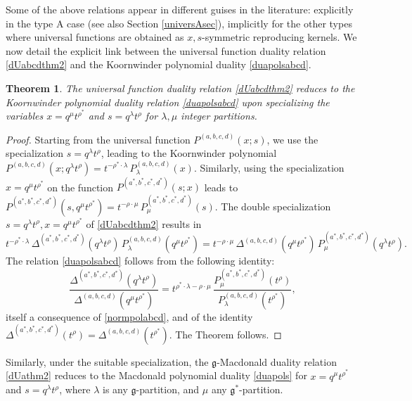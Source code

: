 \documentclass[12pt]{amsart}
\newtheorem{thm}{Theorem}[section]
\newcommand{\g}{{\mathfrak{g}}}
\numberwithin{equation}{section}
\begin{document}
Some of the above relations appear in different guises in the literature: explicitly in the type A case \cite{ShiraishiNoumi} (see also Section \ref{universAsec}), implicitly
for the other types \cite{Cherednik95,cheredMehta} where universal functions are obtained as $x,s$-symmetric
reproducing kernels. We now detail the explicit link between the universal function duality relation \eqref{dUabcdthm2}
and the Koornwinder polynomial duality \eqref{duapolsabcd}.

\begin{thm}
The universal function duality relation \eqref{dUabcdthm2} reduces to the Koornwinder polynomial duality relation \eqref{duapolsabcd} upon specializing the variables $x=q^\mu t^{\rho^*}$ and $s=q^\lambda t^\rho$ for $\lambda,\mu$ integer partitions.
\end{thm}
\begin{proof}
Starting from the universal function $P^{(a,b,c,d)}(x;s)$, we use the specialization
$s=q^\lambda t^\rho$, leading to the 
Koornwinder polynomial
$P^{(a,b,c,d)}(x;q^\lambda t^\rho)=t^{-\rho^*\cdot\lambda} \, P^{(a,b,c,d)}_\lambda(x)$. Similarly, using the specialization
$x=q^\mu t^{\rho^*}$ on the function $P^{(a^*,b^*,c^*,d^*)}(s;x)$ leads to 
$P^{(a^*,b^*,c^*,d^*)}(s,q^\mu t^{\rho^*})=t^{-\rho\cdot\mu} \, P^{(a^*,b^*,c^*,d^*)}_\mu(s)$.
The double specialization $s=q^\lambda t^\rho,x=q^\mu t^{\rho^*}$ of \eqref{dUabcdthm2} results in
\begin{equation}\label{duaP}
t^{-\rho^*\cdot \lambda}\, \Delta^{(a^*,b^*,c^*,d^*)}(q^\lambda t^\rho) \, P^{(a,b,c,d)}_\lambda(q^\mu t^{\rho^*})=t^{-\rho\cdot \mu}\, \Delta^{(a,b,c,d)}(q^\mu t^{\rho^*})\, P_\mu^{(a^*,b^*,c^*,d^*)}(q^\lambda t^{\rho}).
\end{equation}
The relation \eqref{duapolsabcd} follows from the following identity:
\begin{equation}\label{idenDelta}
\frac{\Delta^{(a^*,b^*,c^*,d^*)}(q^\lambda t^\rho)}{\Delta^{(a,b,c,d)}(q^\mu t^{\rho^*})} =t^{\rho^*\cdot \lambda-\rho\cdot \mu}
\,\frac{P_\mu^{(a^*,b^*,c^*,d^*)}(t^{\rho})}{P^{(a,b,c,d)}_\lambda(t^{\rho^*})},
\end{equation}
itself a consequence of \eqref{normpolabcd}, and of the identity $\Delta^{(a^*,b^*,c^*,d^*)}(t^\rho)=\Delta^{(a,b,c,d)}(t^{\rho^*})$.
The Theorem follows.
\end{proof}

Similarly, under the suitable specialization, the $\g$-Macdonald duality relation \eqref{dUathm2} 
reduces to the Macdonald polynomial duality \eqref{duapols} for $x=q^\mu t^{\rho^*}$ and $s=q^\lambda t^\rho$,
where $\lambda$ is any $\g$-partition, and $\mu$ any $\g^*$-partition.
\end{document}
